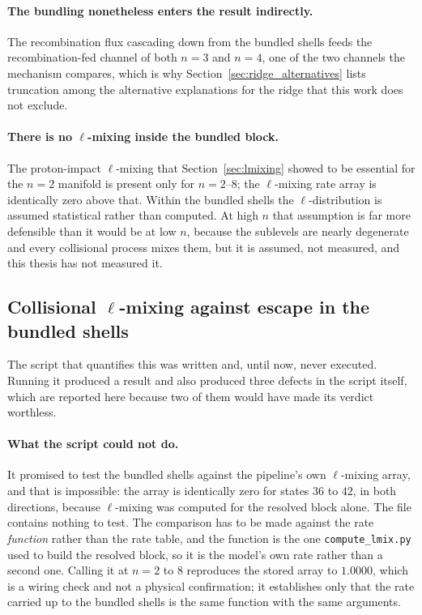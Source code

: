 \paragraph{The bundling nonetheless enters the result indirectly.} The
recombination flux cascading down from the bundled shells feeds the
recombination-fed channel of both $n=3$ and $n=4$, one of the two channels the
mechanism compares, which is why Section~\ref{sec:ridge_alternatives} lists
truncation among the alternative explanations for the ridge that this work does
not exclude.

\paragraph{There is no $\ell$-mixing inside the bundled block.} The
proton-impact $\ell$-mixing that Section~\ref{sec:lmixing} showed to be
essential for the $n = 2$ manifold is present only for $n = 2$--$8$; the
$\ell$-mixing rate array is identically zero above that. Within the bundled
shells the $\ell$-distribution is assumed statistical rather than computed. At
high $n$ that assumption is far more defensible than it would be at low $n$,
because the sublevels are nearly degenerate and every collisional process mixes
them, but it is assumed, not measured, and this thesis has not measured it.

\subsection{Collisional $\ell$-mixing against escape in the bundled shells}
\label{sec:bundling_check}

The script that quantifies this was written and, until now, never executed.
Running it produced a result and also produced three defects in the script
itself, which are reported here because two of them would have made its verdict
worthless.

\paragraph{What the script could not do.} It promised to test the bundled
shells against the pipeline's own $\ell$-mixing array, and that is impossible:
the array is identically zero for states $36$ to $42$, in both directions,
because $\ell$-mixing was computed for the resolved block alone. The file
contains nothing to test. The comparison has to be made against the rate
\emph{function} rather than the rate table, and the function is the one
\texttt{compute\_lmix.py} used to build the resolved block, so it is the model's
own rate rather than a second one. Calling it at $n = 2$ to $8$ reproduces the
stored array to $1.0000$, which is a wiring check and not a physical
confirmation; it establishes only that the rate carried up to the bundled
shells is the same function with the same arguments.

